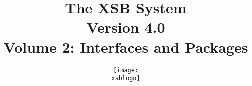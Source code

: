 \documentclass[12pt]{report}
\newcommand{\version}{Version 4.0}
\newcommand{\xsblogo}{{xsb-logo}}
\begin{document}
\title{\bf The XSB System \\ \version \\ Volume 2:
Interfaces and Packages}

\author{{\texttt{[image: \\xsblogo]}}\\
        \ \\ \ \\
} 

\maketitle


\thispagestyle{empty}

\newpage
\thispagestyle{empty}
%

\tableofcontents
\newpage        %
  

%
%



















%
%





\printindex
\printindex[pred]
\end{document}
